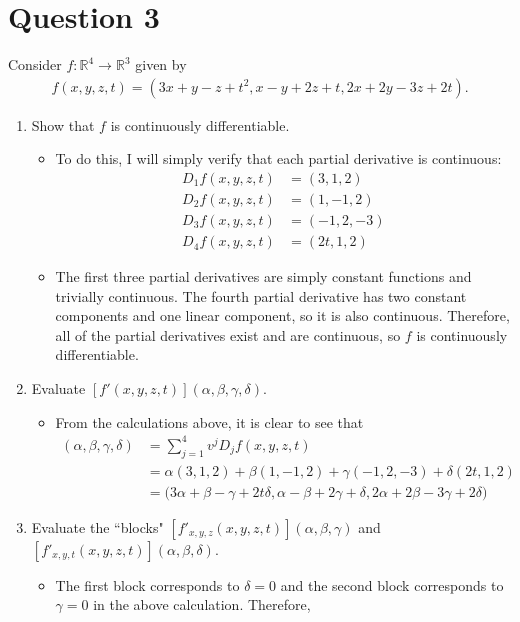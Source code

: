 \documentclass[10pt,a4paper]{article}
\theoremstyle{definition}
\theoremstyle{definition}
\numberwithin{equation}{section}
\begin{document}
\section*{Question 3}
Consider $f: \mathbb{R}^4 \to \mathbb{R}^3$ given by 
\begin{align*}
f(x, y, z, t) = (3x + y - z + t^2, x - y + 2z + t, 2x + 2y - 3z + 2t).
\end{align*}
\begin{enumerate}[label = (\alph*)]
\item Show that $f$ is continuously differentiable. 
	\begin{itemize}
	\item To do this, I will simply verify that each partial derivative is continuous:
	\begin{align*}
	D_1f(x, y, z, t) &= (3, 1, 2)\\
	D_2f(x, y, z, t) &= (1, -1, 2)\\
	D_3f(x, y, z, t) &= (-1, 2, -3)\\
	D_4f(x, y, z, t) &= (2t, 1, 2)
	\end{align*}
	\item The first three partial derivatives are simply constant functions and trivially continuous. The fourth partial derivative has two constant components and one linear component, so it is also continuous. Therefore, all of the partial derivatives exist and are continuous, so $f$ is continuously differentiable. 
	\end{itemize}
\item Evaluate $[f'(x, y, z, t)](\alpha, \beta, \gamma, \delta)$.
	\begin{itemize}
	\item From the calculations above, it is clear to see that
	\begin{align*}
	[f'(x, y, z, t)](\alpha, \beta, \gamma, \delta) &= \sum_{j = 1}^4 v^j D_j f(x, y, z, t)\\
	&= \alpha (3, 1, 2) + \beta(1, -1, 2) + \gamma(-1, 2, -3) + \delta (2t, 1, 2)\\
	&= \bigg(3\alpha + \beta - \gamma + 2t\delta, \alpha - \beta + 2\gamma + \delta, 2\alpha + 2\beta - 3\gamma + 2\delta\bigg)
	\end{align*}
	\end{itemize}
\item Evaluate the ``blocks" $[f'_{x, y, z}(x, y, z, t)](\alpha, \beta, \gamma)$ and $[f'_{x, y, t}(x, y, z, t)](\alpha, \beta, \delta)$. 
	\begin{itemize}
	\item The first block corresponds to $\delta = 0$ and the second block corresponds to $\gamma = 0$ in the above calculation. Therefore,

\end{itemize}
\end{enumerate}
\end{document}
